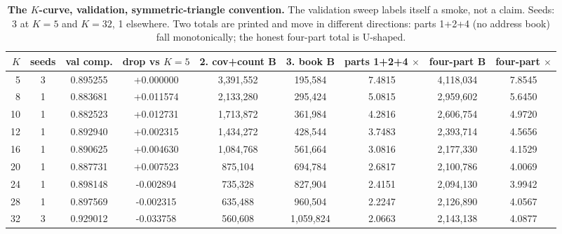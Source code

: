 \documentclass{article} %
\begin{document}
\begin{table}[h]
\centering\small
\caption{\textbf{The $K$-curve, validation, symmetric-triangle convention.} The validation sweep
labels itself a smoke, not a claim. Seeds: 3 at $K=5$ and $K=32$, 1 elsewhere. Two totals are
printed and move in different directions: parts 1+2+4 (no address book) fall monotonically; the
honest four-part total is U-shaped.}
\label{tab:kcurve}
\setlength{\tabcolsep}{2.4pt}
\begin{tabular}{rcccccccc}
\toprule
$K$ & seeds & val comp. & drop vs $K{=}5$ & 2. cov+count B & 3. book B & parts 1+2+4 $\times$ & four-part B & four-part $\times$ \\
\midrule
5 & 3 & 0.895255 & +0.000000 & 3,391,552 & 195,584 & 7.4815 & 4,118,034 & 7.8545 \\
8 & 1 & 0.883681 & +0.011574 & 2,133,280 & 295,424 & 5.0815 & 2,959,602 & 5.6450 \\
10 & 1 & 0.882523 & +0.012731 & 1,713,872 & 361,984 & 4.2816 & 2,606,754 & 4.9720 \\
12 & 1 & 0.892940 & +0.002315 & 1,434,272 & 428,544 & 3.7483 & 2,393,714 & 4.5656 \\
16 & 1 & 0.890625 & +0.004630 & 1,084,768 & 561,664 & 3.0816 & 2,177,330 & 4.1529 \\
20 & 1 & 0.887731 & +0.007523 & 875,104 & 694,784 & 2.6817 & 2,100,786 & 4.0069 \\
24 & 1 & 0.898148 & -0.002894 & 735,328 & 827,904 & 2.4151 & 2,094,130 & 3.9942 \\
28 & 1 & 0.897569 & -0.002315 & 635,488 & 960,504 & 2.2247 & 2,126,890 & 4.0567 \\
32 & 3 & 0.929012 & -0.033758 & 560,608 & 1,059,824 & 2.0663 & 2,143,138 & 4.0877 \\
\bottomrule
\end{tabular}
\end{table}
\end{document}

